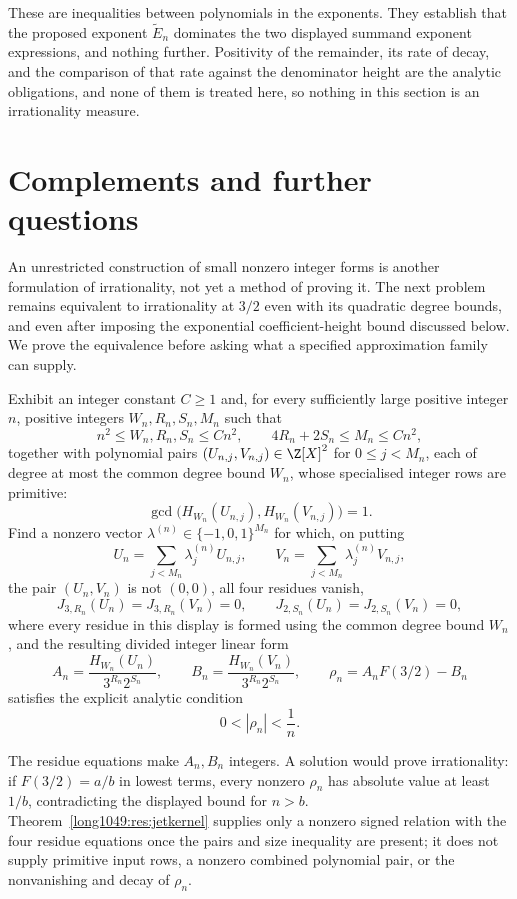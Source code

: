 These are inequalities between polynomials in the exponents. They
establish that the proposed exponent $\widetilde{E}_n$ dominates the two
displayed summand exponent expressions, and nothing further.  Positivity of the remainder, its rate of
decay, and the comparison of that rate against the denominator height are the
analytic obligations, and none of them is treated here, so nothing in this
section is an irrationality measure.

\section{Complements and further questions}\label{long1049:sec:open}

An unrestricted construction of small nonzero integer forms is
another formulation of irrationality, not yet a method of proving
it. The next problem remains equivalent to irrationality at $3/2$
even with its quadratic degree bounds, and even after imposing
the exponential coefficient-height bound discussed below.
We prove the equivalence before asking what a specified
approximation family can supply.

\begin{problem}\label{long1049:prob:kernel}
Exhibit an integer constant \(C\ge1\) and, for every sufficiently large
positive integer \(n\), positive integers \(W_n,R_n,S_n,M_n\) such that
\[
 n^2\le W_n,R_n,S_n\le Cn^2,
 \qquad 4R_n+2S_n\le M_n\le Cn^2,
\]
together with polynomial pairs
\((U_{n,j},V_{n,j})\in\Z[X]^2\) for \(0\le j<M_n\), each of degree at most
the common degree bound \(W_n\), whose specialised integer rows are
primitive:
\[
 \gcd\!\bigl(H_{W_n}(U_{n,j}),H_{W_n}(V_{n,j})\bigr)=1.
\]
Find a nonzero vector
\(\lambda^{(n)}\in\{-1,0,1\}^{M_n}\) for which, on putting
\[
 U_n=\sum_{j<M_n}\lambda^{(n)}_jU_{n,j},
 \qquad V_n=\sum_{j<M_n}\lambda^{(n)}_jV_{n,j},
\]
the pair \((U_n,V_n)\) is not \((0,0)\), all four residues vanish,
\[
 J_{3,R_n}(U_n)=J_{3,R_n}(V_n)=0,
 \qquad J_{2,S_n}(U_n)=J_{2,S_n}(V_n)=0,
\]
where every residue in this display is formed using the common degree bound \(W_n\),
and the resulting divided integer linear form
\[
 A_n=\frac{H_{W_n}(U_n)}{3^{R_n}2^{S_n}},
 \qquad
 B_n=\frac{H_{W_n}(V_n)}{3^{R_n}2^{S_n}},
 \qquad
 \rho_n=A_nF(3/2)-B_n
\]
satisfies the explicit analytic condition
\[
 0<|\rho_n|<\frac1n.
\]
\end{problem}

The residue equations make \(A_n,B_n\) integers.  A solution would prove
irrationality: if \(F(3/2)=a/b\) in lowest terms, every nonzero \(\rho_n\) has
absolute value at least \(1/b\), contradicting the displayed bound for
\(n>b\).  Theorem~\ref{long1049:res:jetkernel} supplies only a nonzero signed relation
with the four residue equations once the pairs and size inequality are present; it
does not supply primitive input rows, a nonzero combined polynomial pair, or
the nonvanishing and decay of \(\rho_n\).

